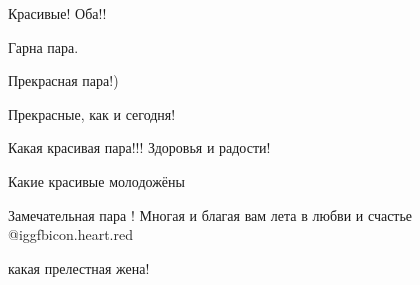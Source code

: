  
 
 
 
 

Красивые! Оба!!

Гарна пара.

Прекрасная пара!)

Прекрасные, как и сегодня!

Какая красивая пара!!! Здоровья и радости!

Какие красивые молодожёны

Замечательная пара ! Многая и благая вам лета в любви и счастье @igg{fbicon.heart.red}

какая прелестная жена!
